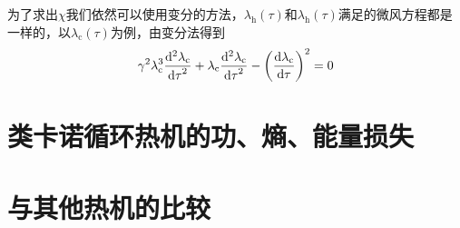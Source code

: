 为了求出$\chi$我们依然可以使用变分的方法，$\lambda_{\mathrm{h}}(\tau)$和$\lambda_{\mathrm{h}}(\tau)$满足的微风方程都是一样的，以$\lambda_{\mathrm{c}}(\tau)$为例，由变分法得到
\begin{equation}
    \gamma^{2} \lambda_{\mathrm{c}}^{3} \frac{\mathrm{d}^{2} \lambda_{\mathrm{c}}}{{\mathrm{d} \tau}^{2}}+\lambda_{\mathrm{c}} \frac{\mathrm{d}^{2} \lambda_{\mathrm{c}}}{{\mathrm{d} \tau}^{2}}-\left(\frac{\mathrm{d} \lambda_{\mathrm{c}}}{\mathrm{d} \tau}\right)^{2}=0
    \label{3.47}
\end{equation}




\section{类卡诺循环热机的功、熵、能量损失}

\section{与其他热机的比较}
